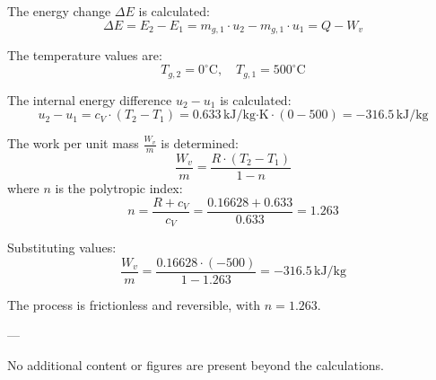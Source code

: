 The energy change \( \Delta E \) is calculated:  
\[
\Delta E = E_2 - E_1 = m_{g,1} \cdot u_2 - m_{g,1} \cdot u_1 = Q - W_v
\]  

The temperature values are:  
\[
T_{g,2} = 0^\circ\text{C}, \quad T_{g,1} = 500^\circ\text{C}
\]  

The internal energy difference \( u_2 - u_1 \) is calculated:  
\[
u_2 - u_1 = c_V \cdot (T_2 - T_1) = 0.633 \, \text{kJ/kg·K} \cdot (0 - 500) = -316.5 \, \text{kJ/kg}
\]  

The work per unit mass \( \frac{W_v}{m} \) is determined:  
\[
\frac{W_v}{m} = \frac{R \cdot (T_2 - T_1)}{1 - n}
\]  
where \( n \) is the polytropic index:  
\[
n = \frac{R + c_V}{c_V} = \frac{0.16628 + 0.633}{0.633} = 1.263
\]  

Substituting values:  
\[
\frac{W_v}{m} = \frac{0.16628 \cdot (-500)}{1 - 1.263} = -316.5 \, \text{kJ/kg}
\]  

The process is frictionless and reversible, with \( n = 1.263 \).  

---

No additional content or figures are present beyond the calculations.